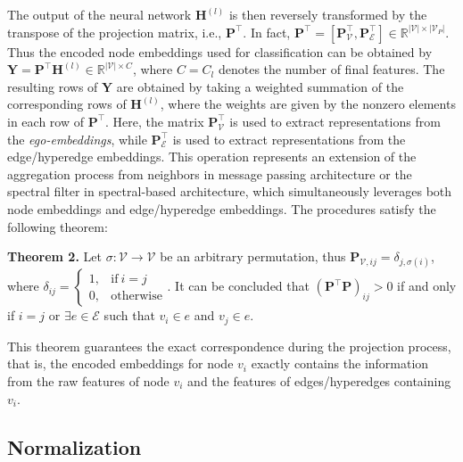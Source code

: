 \documentclass[review]{elsarticle}
\begin{document}
The output of the neural network $\mathbf{H}^{(l)}$ is then reversely transformed by the transpose of the projection matrix, i.e., $\mathbf{P}^\top$. In fact, $\mathbf{P}^\top=\left[\mathbf{P}^\top_\mathcal{V},\mathbf{P}^\top_\mathcal{E}\right]\in\mathbb{R}^{|\mathcal{V}|\times|\mathcal{V}_{P}|}$. Thus the encoded node embeddings used for classification can be obtained by $\mathbf{Y}=\mathbf{P}^{\top}\mathbf{H}^{(l)}\in\mathbb{R}^{|\mathcal{V}|\times C}$, where $C=C_l$ denotes the number of final features. The resulting rows of $\mathbf{Y}$ are obtained by taking a weighted summation of the corresponding rows of $\mathbf{H}^{(l)}$, where the weights are given by the nonzero elements in each row of $\mathbf{P}^\top$. Here, the matrix $\mathbf{P}^{\top}_\mathcal{V}$ is used to extract representations from the \textit{ego-embeddings}, while $\mathbf{P}^{\top}_\mathcal{E}$ is used to extract representations from the edge/hyperedge embeddings. This operation represents an extension of the aggregation process from neighbors in message passing architecture or the spectral filter in spectral-based architecture, which simultaneously leverages both node embeddings and edge/hyperedge embeddings. The procedures satisfy the following theorem:

\textbf{Theorem 2.} Let $\sigma:\mathcal{V}\to\mathcal{V}$ be an arbitrary permutation, thus $\mathbf{P}_{\mathcal{V},ij}=\delta_{j,\sigma(i)}$, where $\delta_{ij}=\begin{cases}{1,}&{{\mathrm{if~}}i=j}\\{0,}&{{\mathrm{otherwise}}}\end{cases}$. It can be concluded that $(\mathbf{P}^\top\mathbf{P})_{ij}>0$ if and only if $i=j$ or $\exists e\in\mathcal{E}$ such that $v_i\in e$ and $v_j\in e$.

This theorem guarantees the exact correspondence during the projection process, that is, the encoded embeddings for node $v_i$ exactly contains the information from the raw features of node $v_i$ and the features of edges/hyperedges containing $v_i$.

\subsection{Normalization}
\end{document}
